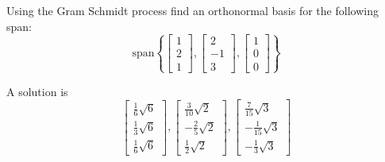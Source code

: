 \documentclass{ximera}
\begin{document}
\begin{problem} Using the Gram Schmidt process find an
orthonormal basis for the following span:
 \[
\mbox{span} \left\{ \left[
\begin{array}{r}
1 \\
2 \\
1
\end{array}
\right] ,\left[
\begin{array}{r}
2 \\
-1 \\
3
\end{array}
\right] , \left[
\begin{array}{r}
1 \\
0 \\
0
\end{array}
\right] \right\}
\]
\begin{hint}
A solution is
\[
\left[
\begin{array}{c}
\frac{1}{6}\sqrt{6} \\
\frac{1}{3}\sqrt{6} \\
\frac{1}{6}\sqrt{6}
\end{array}
\right] ,\left[
\begin{array}{c}
\frac{3}{10}\sqrt{2} \\
-\frac{2}{5}\sqrt{2} \\
\frac{1}{2}\sqrt{2}
\end{array}
\right] ,\left[
\begin{array}{c}
\frac{7}{15}\sqrt{3} \\
-\frac{1}{15}\sqrt{3} \\
-\frac{1}{3}\sqrt{3}
\end{array}
\right]
\]
\end{hint}
\end{problem}
\end{document}
